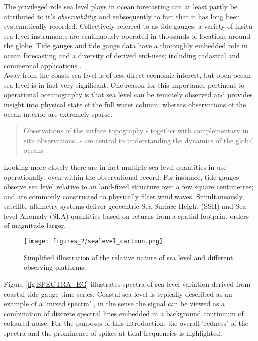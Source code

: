The privileged role sea level plays in ocean forecasting can at least partly be attributed to it's \emph{observability}; and subsequently to fact that it has long been systematically recorded.  Collectively referred to as tide gauges, a variety of insitu sea level instruments are continuously operated in thousands of locations around the globe.   Tide gauges and tide gauge data have a thoroughly embedded role in ocean forecasting and a diversity of derived end-uses; including cadastral and commercial applications \cite{Level:2011wu}.\\
Away from the coasts sea level is of less direct economic interest, but open ocean sea level is in fact very significant.  One reason for this importance pertinent to operational oceanography is that sea level can be remotely observed and provides insight into physical state of the full water column; whereas observations of the ocean interior are extremely sparse.
\begin{quote}
Observations of the surface topography - together with complementary in situ observations\dots{}- are central to understanding the dynamics of the global oceans \citep{Wilson:2010hy}.
\end{quote}




Looking more closely there are in fact multiple sea level quantities in use operationally; even within the observational record.
For instance, tide gauges observe sea level relative to an land-fixed structure over a few square centimetres; and are commonly constructed to physically filter wind waves.  Simultaneously, satellite altimetry systems deliver geocentric Sea Surface Height (SSH) and Sea level Anomaly (SLA) quantities based on returns from a spatial footprint orders of magnitude larger. \\

\begin{figure}[!h]
\begin{center}
\texttt{[image: figures\_2/sealevel\_cartoon.png]}
\caption{Simplified illustration of the relative nature of sea level and different observing platforms.}
\label{fig:SEALEVEL}
\end{center}
\end{figure}



Figure \ref{fig:SPECTRA_EG} illustrates spectra of sea level variation derived from coastal tide gauge time-series.  Coastal sea level is typically described as an example of a `mixed spectra' \citep{Percival:1998tw}, in the sense the signal can be viewed as a combination of discrete spectral lines embedded in a background continuum of coloured noise.  For the purposes of this introduction, the overall `redness' of the spectra and the prominence of spikes at tidal frequencies is highlighted.\\

